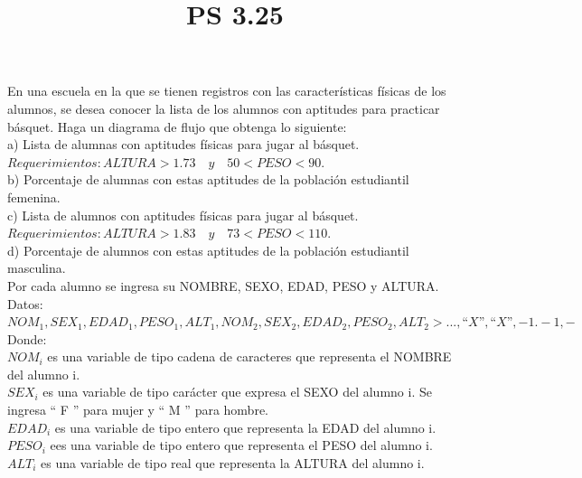 \documentclass[11pt]{amsart}
\title{PS 3.25}
\begin{document}
\maketitle

\noindent En una escuela en la que se tienen registros con las características físicas de los alumnos, se desea conocer la lista de los alumnos con aptitudes para practicar básquet. Haga un diagrama de flujo que obtenga lo siguiente:\\

\noindent a) Lista de alumnas con aptitudes físicas para jugar al básquet.\\

\noindent \quad $Requerimientos : ALTURA > 1. 73 \quad y \quad 50 < PESO < 90$.\\

\noindent b) Porcentaje de alumnas con estas aptitudes de la población estudiantil femenina.\\

\noindent c) Lista de alumnos con aptitudes físicas para jugar al básquet.\\

\noindent \quad $Requerimientos : ALTURA > 1.83  \quad y  \quad 73 < PESO < 110$.\\

\noindent d) Porcentaje de alumnos con estas aptitudes de la población estudiantil masculina.\\

\noindent Por cada alumno se ingresa su NOMBRE, SEXO, EDAD, PESO y ALTURA.\\

\noindent Datos: $NOM_{1}, SEX_{1}, EDAD_{1}, PESO_{1}, ALT_{1}, NOM_{2}, SEX_{2}, EDAD_{2}, PESO_{2}, ALT_{2}> . . ., “ X ”, “ X ”,- 1.-1,-$\\

\noindent Donde:\\

\noindent \quad $NOM_i$ es una variable de tipo cadena de caracteres que representa el NOMBRE del alumno i.\\

\noindent \quad $SEX_i$ es una variable de tipo carácter que expresa el SEXO del alumno i. Se ingresa “ F ” para mujer y “ M ” para hombre.\\

\noindent \quad $EDAD_i$ es una variable de tipo entero que representa la EDAD del alumno i.\\

\noindent \quad $PESO_i$ ees una variable de tipo entero que representa el PESO del alumno i.\\

\noindent \quad $ALT_i$ es una variable de tipo real que representa la ALTURA del alumno i.\\
\end{document}
